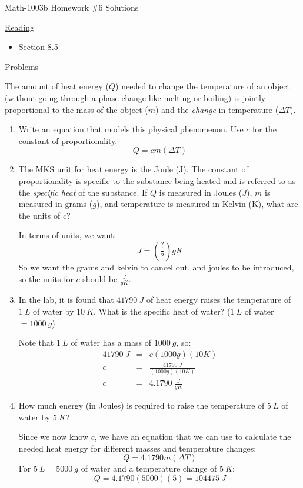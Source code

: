 \documentclass[letterpaper,12pt,fleqn]{article}
\newcommand{\D}{\Delta}
\begin{document}
\begin{center}
\Large Math-1003b Homework \#6 Solutions
\end{center}

\vspace{0.5in}

\underline{Reading}

\bigskip

\begin{itemize}
\item Section 8.5
\end{itemize}

\bigskip

\underline{Problems}

\bigskip

The amount of heat energy ($Q$) needed to change the temperature of an
object (without going through a phase change like melting or boiling) is jointly
proportional to the mass of the object ($m$) and the \emph{change} in
temperature ($\D T$).
\begin{enumerate}
\item Write an equation that models this physical phenomenon. Use $c$ for the
  constant of proportionality.
  \[Q=cm(\D T)\]
  
\item The MKS unit for heat energy is the Joule (J). The constant of
  proportionality is specific to the substance being heated and is referred to
  as the \emph{specific heat} of the substance. If $Q$ is measured in Joules
  ($J$), $m$ is measured in grams ($g$), and temperature is measured in Kelvin
  (K), what are the units of $c$?

  In terms of units, we want:
  \[J=\left(\frac{?}{?}\right)gK\]
  So we want the grams and kelvin to cancel out, and joules to be introduced, so the
  units for $c$ should be $\frac{J}{gK}$.
  
\item In the lab, it is found that $\SI{41790}{J}$ of heat energy raises the
  temperature of $\SI{1}{L}$ of water by $\SI{10}{K}$. What is the specific heat
  of water? ($\SI{1}{L}$ of water$=\SI{1000}{g}$)

  Note that $\SI{1}{L}$ of water has a mass of $\SI{1000}{g}$, so:
  \begin{eqnarray*}
    \SI{41790}{J} &=& c(1000g)(10K) \\
    c &=& \frac{\SI{41790}{J}}{(1000g)(10K)} \\
    c &=& \SI{4.1790}{\frac{J}{gK}}
  \end{eqnarray*}
  
\item How much energy (in Joules) is required to raise the temperature of
  $\SI{5}{L}$ of water by $\SI{5}{K}$?

  Since we now know $c$, we have an equation that we can use to calculate the needed
  heat energy for different masses and temperature changes:
  \[Q=4.1790m(\D T)\]
  For $\SI{5}{L}=\SI{5000}{g}$ of water and a temperature change of $\SI{5}{K}$:
  \[Q=4.1790(5000)(5)=\SI{104475}{J}\]
\end{enumerate}
\end{document}
